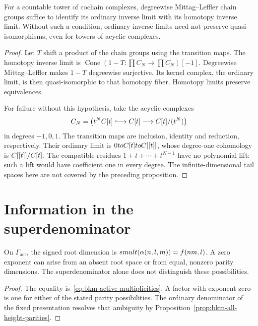 \begin{proposition}
\label{prop:bkm-limit-complexes}
For a countable tower of cochain complexes, degreewise
Mittag--Leffler chain groups suffice to identify its ordinary
inverse limit with its homotopy inverse limit. Without such a
condition, ordinary inverse limits need not preserve
quasi-isomorphisms, even for towers of acyclic complexes.
\end{proposition}
\begin{proof}
Let $T$ shift a product of the chain groups using the transition
maps. The homotopy inverse limit is
$\operatorname{Cone}(1-T:\prod C_N\to\prod C_N)[-1]$.
Degreewise Mittag--Leffler makes $1-T$ degreewise surjective.
Its kernel complex, the ordinary limit, is then quasi-isomorphic
to that homotopy fiber. Homotopy limits preserve equivalences.

For failure without this hypothesis, take the acyclic complexes
\[
 C_N=\bigl(t^N\C[t]\lhook\joinrel\longrightarrow
             \C[t]\longrightarrow\C[t]/(t^N)\bigr)
\]
in degrees $-1,0,1$. The transition maps are inclusion, identity
and reduction, respectively. Their ordinary limit is
$0toC[t]toC[[t]]$, whose degree-one cohomology is
$C[[t]]/C[t]$. The compatible residues
$1+t+\cdots+t^{N-1}$ have no polynomial lift: such a lift would
have coefficient one in every degree. The infinite-dimensional
tail spaces here are not covered by the preceding proposition.
\end{proof}

\section{Information in the superdenominator}
\label{sec:bkm-chiral-shadow}
\label{sec:bkm-chiral-shadow-character}

\begin{lemma}
\label{lem:bkm-active-multiplicity}
On $\Gamma_{\mathrm{act}}$, the signed root dimension is
$smult(\alpha(n,l,m))=f(nm,l)$. A zero exponent can arise from an absent root space or from equal,
nonzero parity dimensions. The superdenominator alone does not
distinguish these possibilities.
\end{lemma}
\begin{proof}
The equality is~\eqref{eq:bkm-active-multiplicities}.
A factor with exponent zero is one for either of the stated parity
possibilities. The ordinary denominator of the fixed presentation
resolves that ambiguity by Proposition~\ref{prop:bkm-all-height-parities}.
\end{proof}

